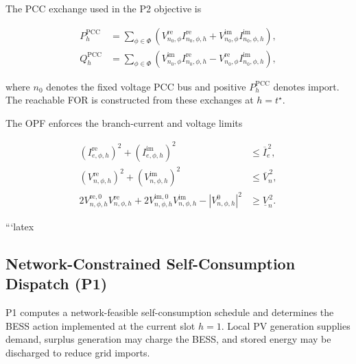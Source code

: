 \documentclass[journal]{IEEEtran}
\begin{document}
The PCC exchange used in the P2 objective is

\begin{subequations}
\label{eq:pcc_exchange}
\begin{align}
P^{\mathrm{PCC}}_{h}
&=
\sum_{\phi\in\Phi}
\left(
V^{\mathrm{re}}_{n_0,\phi}I^{\mathrm{re}}_{n_0,\phi,h}
+
V^{\mathrm{im}}_{n_0,\phi}I^{\mathrm{im}}_{n_0,\phi,h}
\right),
\label{eq:ppcc}
\\
Q^{\mathrm{PCC}}_{h}
&=
\sum_{\phi\in\Phi}
\left(
V^{\mathrm{im}}_{n_0,\phi}I^{\mathrm{re}}_{n_0,\phi,h}
-
V^{\mathrm{re}}_{n_0,\phi}I^{\mathrm{im}}_{n_0,\phi,h}
\right),
\label{eq:qpcc}
\end{align}
\end{subequations}

where \(n_0\) denotes the fixed voltage PCC bus and positive \(P^{\mathrm{PCC}}_{h}\) denotes import. The reachable FOR is constructed from these exchanges at \(h=t^\star\).

The OPF enforces the branch-current and voltage limits

\begin{subequations}
\label{eq:network_limits}
\begin{align}
\left(I^{\mathrm{re}}_{e,\phi,h}\right)^2
+
\left(I^{\mathrm{im}}_{e,\phi,h}\right)^2
&\leq
\overline{I}_{e}^{\,2},
\label{eq:thermal}
\\
\left(V^{\mathrm{re}}_{n,\phi,h}\right)^2
+
\left(V^{\mathrm{im}}_{n,\phi,h}\right)^2
&\leq
\overline{V}_{n}^{\,2},
\label{eq:vmax}
\\
2V^{\mathrm{re},0}_{n,\phi,h}V^{\mathrm{re}}_{n,\phi,h}
+
2V^{\mathrm{im},0}_{n,\phi,h}V^{\mathrm{im}}_{n,\phi,h}
-
\left|V^{0}_{n,\phi,h}\right|^{2}
&\geq
\underline{V}_{n}^{\,2}.
\label{eq:vmin}
\end{align}
\end{subequations}

```latex
\subsection{Network-Constrained Self-Consumption Dispatch (P1)}
\label{ssec:selfconsumption}
P1 computes a network-feasible self-consumption schedule and determines the BESS action implemented at the current slot \(h=1\). Local PV generation supplies demand, surplus generation may charge the BESS, and stored energy may be discharged to reduce grid imports.
\end{document}
